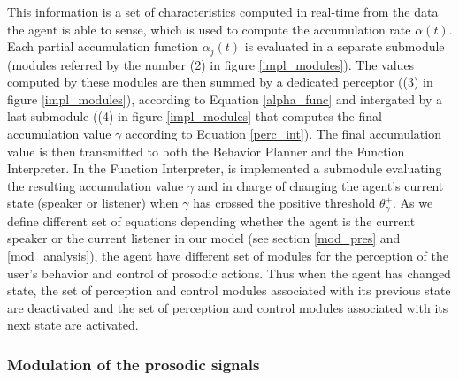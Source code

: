 This information is a set of characteristics computed in real-time from the data the agent is able to sense, which is used to compute the accumulation rate $\alpha(t)$. 
Each partial accumulation function $\alpha_j(t)$ is evaluated in a separate submodule (modules referred by the number (2) in figure \ref{impl_modules}). The values computed by these modules are then summed by a dedicated perceptor ((3) in figure \ref{impl_modules}), according to Equation \ref{alpha_func} and intergated by a last submodule ((4) in figure \ref{impl_modules} that computes the final accumulation value $\gamma$ according to Equation \ref{perc_int}). The final accumulation value is then transmitted to both the Behavior Planner and the Function Interpreter. In the Function Interpreter, is implemented a submodule evaluating the resulting accumulation value $\gamma$ and in charge of changing the agent's current state (speaker or listener) when $\gamma$ has crossed the positive threshold $\theta_{\gamma}^{+}$. As we define different set of equations depending whether the agent is the current speaker or the current listener in our model (see section \ref{mod_pres} and \ref{mod_analysis}), the agent have different set of modules for the perception of the user's behavior and control of prosodic actions. Thus when the agent has changed state, the set of perception and control modules associated with its previous state are deactivated and the set of perception and control modules associated with its next state are activated. 


\subsubsection{Modulation of the prosodic signals}

